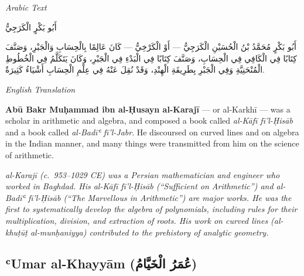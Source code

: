 \documentclass[11pt,a4paper]{article}
\def\RL#1{\beginR#1\endR}
\newcommand{\cnote}[1]{\textcolor{notecolor}{\textit{#1}}}
\newcommand{\textarabic}[1]{{\arabicfont\RL{#1}}}
\newenvironment{arabiccol}{%
  \begin{minipage}[t]{0.48\textwidth}%
  \begin{tcolorbox}[colback=leftbg,colframe=rulecolor,boxrule=0.4pt,arc=2pt,left=5pt,right=5pt,top=5pt,bottom=5pt]%
  \centering\textit{\footnotesize Arabic Text}\\[0.4em]%
  \raggedright\arabicfont\small%
}{%
  \end{tcolorbox}%
  \end{minipage}%
}
\newenvironment{englishcol}{%
  \begin{minipage}[t]{0.48\textwidth}%
  \begin{tcolorbox}[colback=rightbg,colframe=rulecolor,boxrule=0.4pt,arc=2pt,left=5pt,right=5pt,top=5pt,bottom=5pt]%
  \centering\textit{\footnotesize English Translation}\\[0.4em]%
  \raggedright\small%
}{%
  \end{tcolorbox}%
  \end{minipage}%
}
\begin{document}
\noindent
\begin{arabiccol}
\beginR
أَبُو بَكْرٍ الْكَرَجِيُّ

أَبُو بَكْرٍ مُحَمَّدُ بْنُ الْحُسَيْنِ الْكَرَجِيُّ — أَوْ الْكَرْخِيُّ — كَانَ عَالِمًا بِالْحِسَابِ وَالْجَبْرِ، وَصَنَّفَ كِتَابًا فِي الْكَافِي فِي الْحِسَابِ، وَصَنَّفَ كِتَابًا فِي الْبَدْءِ فِي الْجَبْرِ، وَكَانَ يَتَكَلَّمُ فِي الْخُطُوطِ الْمُنْحَنِيَّةِ وَفِي الْجَبْرِ بِطَرِيقَةِ الْهِنْدِ، وَقَدْ نُقِلَ عَنْهُ فِي عِلْمِ الْحِسَابِ أَشْيَاءُ كَثِيرَةٌ.
\endR
\end{arabiccol}
\hfill
\begin{englishcol}
\textbf{Abū Bakr Muḥammad ibn al-Ḥusayn al-Karajī} --- or al-Karkhī --- was a scholar in arithmetic and algebra, and composed a book called \textit{al-Kāfī fī'l-Ḥisāb} and a book called \textit{al-Badīʿ fī'l-Jabr}. He discoursed on curved lines and on algebra in the Indian manner, and many things were transmitted from him on the science of arithmetic.

\cnote{al-Karajī (c.~953--1029 CE) was a Persian mathematician and engineer who worked in Baghdad. His \textit{al-Kāfī fī'l-Ḥisāb} (``Sufficient on Arithmetic'') and \textit{al-Badīʿ fī'l-Ḥisāb} (``The Marvellous in Arithmetic'') are major works. He was the first to systematically develop the algebra of polynomials, including rules for their multiplication, division, and extraction of roots. His work on curved lines (\textit{al-khuṭūṭ al-munḥaniyya}) contributed to the prehistory of analytic geometry.}
\end{englishcol}

\par\vspace{0.5em}

\subsection{ʿUmar al-Khayyām (\textarabic{عُمَرُ الْخَيَّامُ})}
\end{document}
